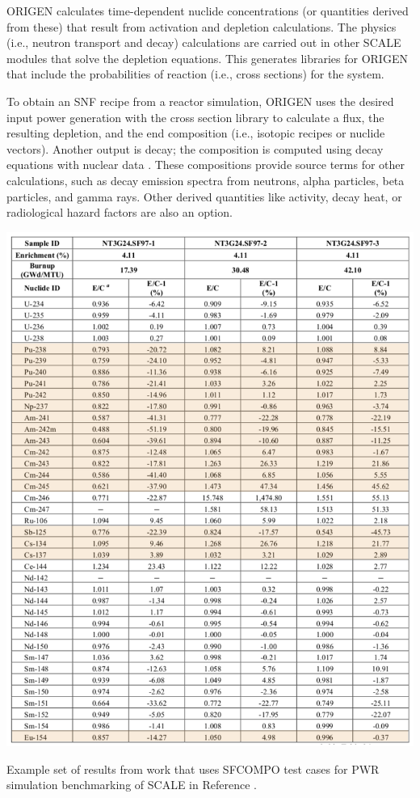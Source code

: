 \gls{ORIGEN} calculates time-dependent nuclide concentrations (or quantities
derived from these) that result from activation and depletion calculations. The
physics (i.e., neutron transport and decay) calculations are carried out in
other \gls{SCALE} modules that solve the depletion equations.  This generates
libraries for \gls{ORIGEN} that include the probabilities of reaction (i.e.,
cross sections) for the system.

To obtain an \gls{SNF} recipe from a reactor simulation, \gls{ORIGEN} uses the
desired input power generation with the cross section library to calculate a
flux, the resulting depletion, and the end composition (i.e., isotopic recipes
or nuclide vectors).  Another output is decay; the composition is computed
using decay equations with nuclear data \cite{endf}. These compositions provide
source terms for other calculations, such as decay emission spectra from
neutrons, alpha particles, beta particles, and gamma rays. Other derived
quantities like activity, decay heat, or radiological hazard factors are also
an option.

\begin{table}[!htbp]
  \centering
  \includegraphics[width=\linewidth]{./chapters/exp1/pwr_benchmark.png}
  \caption[Example of \acrshort{SCALE} simulation benchmarking results]
          {Example set of results from work that uses \acrshort{SFCOMPO} test 
           cases for \acrshort{PWR} simulation benchmarking of \acrshort{SCALE} 
           in Reference \cite{pwr_benchmark_2010}.}
  \label{tbl:pwr_bench}
\end{table}

